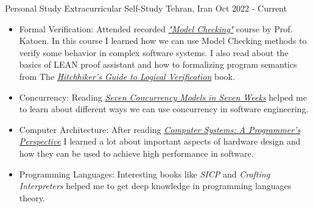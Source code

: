 \begin{cventries}
  \cventry
  {Personal Study} %
  {Extracurricular Self-Study} %
  {Tehran, Iran} %
  {Oct 2022 - Current} %
  {
    \begin{cvitems} %
    \item {
        \begin{itemize}
        \item  Formal Verification: \newline
          Attended recorded \href{https://www.youtube.com/playlist?list=PLwabKnOFhE38C0o6z_bhlF_uOUlblDTjh}{\textit{"Model Checking"}} course by Prof. Katoen. In this course I learned how we can use Model Checking methods to verify some behavior in complex software systems.
          \newline
          I also read about the basics of LEAN proof assistant and how to formalizing program semantics from The \href{https://github.com/blanchette/logical_verification_2023}{\textit{Hitchhiker’s Guide to Logical Verification}} book.
        \item  Concurrency: \newline
          Reading \href{https://pragprog.com/titles/pb7con/seven-concurrency-models-in-seven-weeks/}{\textit{Seven Concurrency Models in Seven Weeks}} helped me to learn about different ways we can use concurrency in software engineering.
        \item Computer Architecture:
          \newline
          After reading
          \href{http://csapp.cs.cmu.edu/2e/samples.html}{\textit{
              Computer Systems: A Programmer's Perspective}} I learned a lot about important aspects of hardware design and how they can be used to achieve high performance in software.
        \item Programming Languages:
          \newline
          Interesting books like \textit{SICP} and \textit{Crafting Interpreters} helped me to get deep knowledge in programming languages theory.
        \end{itemize}
      }
    \end{cvitems}
  }

\end{cventries}
